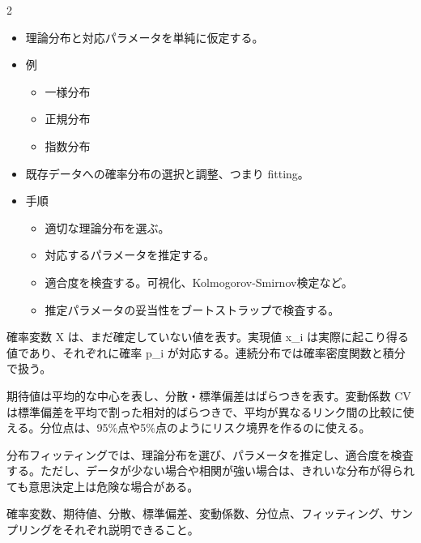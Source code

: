 \begin{multicols}{2}

\footnotesize

\raggedcolumns


\begin{itemize}
\item 理論分布と対応パラメータを単純に仮定する。
\item 例
\begin{itemize}
\item 一様分布
\item 正規分布
\item 指数分布
\end{itemize}
\item 既存データへの確率分布の選択と調整、つまり fitting。
\item 手順
\begin{itemize}
\item 適切な理論分布を選ぶ。
\item 対応するパラメータを推定する。
\item 適合度を検査する。可視化、Kolmogorov-Smirnov検定など。
\item 推定パラメータの妥当性をブートストラップで検査する。
\end{itemize}
\end{itemize}

確率変数 X は、まだ確定していない値を表す。実現値 x\_i は実際に起こり得る値であり、それぞれに確率 p\_i が対応する。連続分布では確率密度関数と積分で扱う。\par

期待値は平均的な中心を表し、分散・標準偏差はばらつきを表す。変動係数 CV は標準偏差を平均で割った相対的ばらつきで、平均が異なるリンク間の比較に使える。分位点は、95\%点や5\%点のようにリスク境界を作るのに使える。\par

分布フィッティングでは、理論分布を選び、パラメータを推定し、適合度を検査する。ただし、データが少ない場合や相関が強い場合は、きれいな分布が得られても意思決定上は危険な場合がある。\par

確率変数、期待値、分散、標準偏差、変動係数、分位点、フィッティング、サンプリングをそれぞれ説明できること。\par


\end{multicols}
